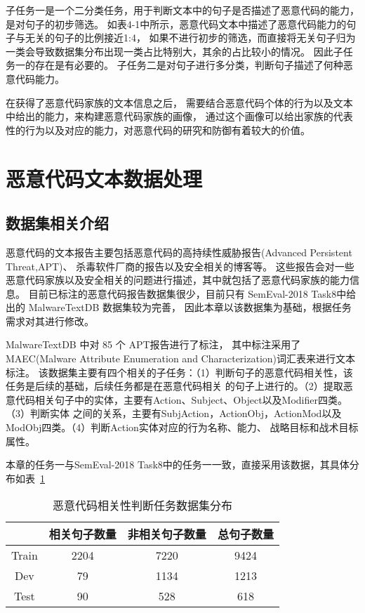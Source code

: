 子任务一是一个二分类任务，用于判断文本中的句子是否描述了恶意代码的能力，是对句子的初步筛选。
如表4-1中所示，恶意代码文本中描述了恶意代码能力的句子与无关的句子的比例接近1:4，
如果不进行初步的筛选，而直接将无关句子归为一类会导致数据集分布出现一类占比特别大，其余的占比较小的情况。
因此子任务一的存在是有必要的。
子任务二是对句子进行多分类，判断句子描述了何种恶意代码能力。

在获得了恶意代码家族的文本信息之后，
需要结合恶意代码个体的行为以及文本中给出的能力，来构建恶意代码家族的画像，
通过这个画像可以给出家族的代表性的行为以及对应的能力，对恶意代码的研究和防御有着较大的价值。


\section{恶意代码文本数据处理}
\subsection{数据集相关介绍}
恶意代码的文本报告主要包括恶意代码的高持续性威胁报告(Advanced Persistent Threat,APT)、
杀毒软件厂商的报告以及安全相关的博客等。
这些报告会对一些恶意代码家族以及安全相关的问题进行描述，其中就包括了恶意代码家族的能力信息。
目前已标注的恶意代码报告数据集很少，目前只有 SemEval-2018 Task8\cite{RN100}中给出的 MalwareTextDB 数据集较为完善，
因此本章以该数据集为基础，根据任务需求对其进行修改。

MalwareTextDB 中对 85 个 APT报告进行了标注， 
其中标注采用了MAEC(Malware Attribute Enumeration and Characterization)词汇表来进行文本标注。
该数据集主要有四个相关的子任务：（1）判断句子的恶意代码相关性，该任务是后续的基础，后续任务都是在恶意代码相关
的句子上进行的。（2）提取恶意代码相关句子中的实体，主要有Action、Subject、Object以及Modifier四类。（3）判断实体
之间的关系，主要有SubjAction，ActionObj，ActionMod以及ModObj四类。（4）判断Action实体对应的行为名称、能力、
战略目标和战术目标属性。

本章的任务一与SemEval-2018 Task8中的任务一一致，直接采用该数据，其具体分布如表~\ref{tab:relative}~
\begin{table}[htb]
	\renewcommand{\arraystretch}{1.3}
	\caption{恶意代码相关性判断任务数据集分布}
	\label{tab:relative}
	\vspace{0.5em}\centering\wuhao
	\begin{tabular}{c c c c}
		\toprule  & 相关句子数量 & 非相关句子数量 & 总句子数量  \\
		\midrule[1pt] 
		Train & 2204 & 7220 & 9424 \\
		Dev & 79 & 1134 & 1213 \\
		Test & 90 & 528 & 618 \\
		 \bottomrule[1.5pt] 
	\end{tabular}
\end{table}

